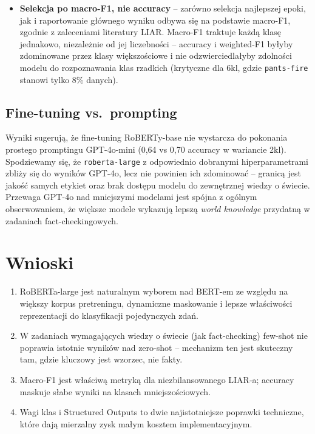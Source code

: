 \documentclass[11pt,a4paper]{article}
\begin{document}
\begin{itemize}
        dobierane przez TF-IDF cosine similarity, a nie losowo --
        kontekst tematycznie zbliżony do zapytania.
  \item \textbf{Selekcja po macro-F1, nie accuracy} -- zarówno selekcja
        najlepszej epoki, jak i raportowanie głównego wyniku odbywa się
        na podstawie macro-F1, zgodnie z zaleceniami literatury LIAR.
        Macro-F1 traktuje każdą klasę jednakowo, niezależnie od jej
        liczebności -- accuracy i weighted-F1 byłyby zdominowane przez
        klasy większościowe i nie odzwierciedlałyby zdolności modelu do
        rozpoznawania klas rzadkich (krytyczne dla 6kl, gdzie
        \texttt{pants-fire} stanowi tylko 8\% danych).
\end{itemize}

\subsection{Fine-tuning vs.\ prompting}

Wyniki sugerują, że fine-tuning RoBERTy-base nie wystarcza do pokonania
prostego promptingu GPT-4o-mini (0{,}64 vs 0{,}70 accuracy w wariancie 2kl).
Spodziewamy się, że \texttt{roberta-large} z odpowiednio dobranymi
hiperparametrami zbliży się do wyników GPT-4o, lecz nie powinien ich
zdominować -- granicą jest jakość samych etykiet oraz brak dostępu modelu
do zewnętrznej wiedzy o świecie. Przewaga GPT-4o nad mniejszymi modelami
jest spójna z ogólnym obserwowaniem, że większe modele wykazują lepszą
\emph{world knowledge} przydatną w zadaniach fact-checkingowych.

\section{Wnioski}

\begin{enumerate}
  \item RoBERTa-large jest naturalnym wyborem nad BERT-em ze względu na
        większy korpus pretreningu, dynamiczne maskowanie i lepsze
        właściwości reprezentacji do klasyfikacji pojedynczych zdań.
  \item W zadaniach wymagających wiedzy o świecie (jak fact-checking)
        few-shot nie poprawia istotnie wyników nad zero-shot -- mechanizm
        ten jest skuteczny tam, gdzie kluczowy jest wzorzec, nie fakty.
  \item Macro-F1 jest właściwą metryką dla niezbilansowanego LIAR-a;
        accuracy maskuje słabe wyniki na klasach mniejszościowych.
  \item Wagi klas i Structured Outputs to dwie najistotniejsze poprawki
        techniczne, które dają mierzalny zysk małym kosztem implementacyjnym.
\end{enumerate}
\end{document}
